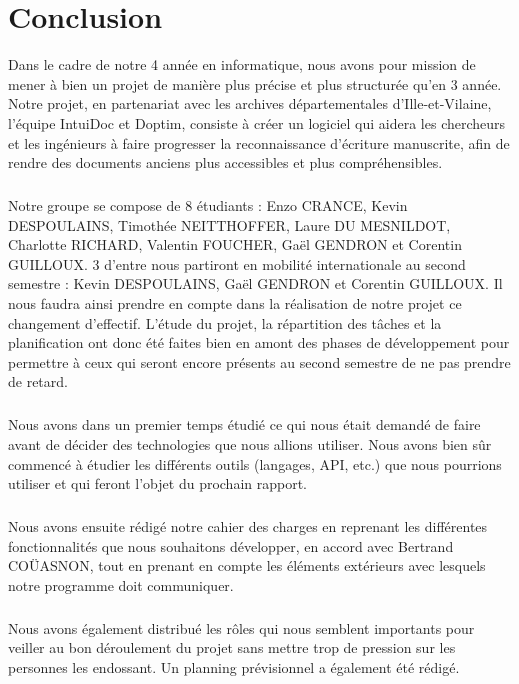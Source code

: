 \chapter{Conclusion}

Dans le cadre de notre 4 année en informatique, nous avons pour mission de
mener à bien un projet de manière plus précise et plus structurée qu’en 3 année.
Notre projet, en partenariat avec les archives départementales d’Ille-et-Vilaine,
l’équipe IntuiDoc et Doptim, consiste à créer un logiciel qui aidera les chercheurs et
les ingénieurs à faire progresser la reconnaissance d’écriture manuscrite, afin de rendre
des documents anciens plus accessibles et plus compréhensibles.

\paragraph{}
Notre groupe se compose de 8 étudiants : Enzo CRANCE, Kevin DESPOULAINS, Timothée NEITTHOFFER,
Laure DU MESNILDOT, Charlotte RICHARD, Valentin FOUCHER, Gaël GENDRON et Corentin GUILLOUX.
3 d’entre nous partiront en mobilité internationale au second semestre : Kevin DESPOULAINS,
Gaël GENDRON et Corentin GUILLOUX. Il nous faudra ainsi prendre en compte dans la réalisation
de notre projet ce changement d’effectif. L’étude du projet, la répartition des tâches et la
planification ont donc été faites bien en amont des phases de développement pour permettre à
ceux qui seront encore présents au second semestre de ne pas prendre de retard.

\paragraph{}
Nous avons dans un premier temps étudié ce qui nous était demandé de faire avant de
décider des technologies que nous allions utiliser. Nous avons bien sûr commencé à
étudier les différents outils (langages, API, etc.) que nous pourrions utiliser et qui
feront l’objet du prochain rapport.

\paragraph{}
Nous avons ensuite rédigé notre cahier des charges en reprenant les différentes fonctionnalités
que nous souhaitons développer, en accord avec Bertrand COÜASNON, tout en prenant en compte
les éléments extérieurs avec lesquels notre programme doit communiquer.

\paragraph{}
Nous avons également distribué les rôles qui nous semblent importants pour veiller au bon
déroulement du projet sans mettre trop de pression sur les personnes les endossant.
Un planning prévisionnel a également été rédigé.